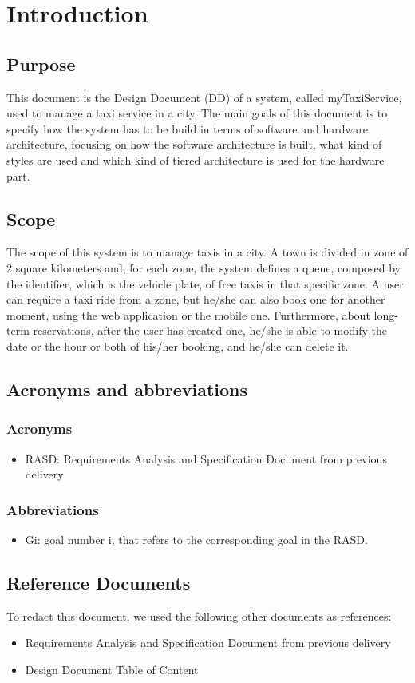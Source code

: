 \section{Introduction}
\subsection{Purpose}
	This document is the Design Document (DD) of a system, called myTaxiService, used to manage  a taxi service in a city. The main goals of this document is to specify how the system has to be build in terms of software and hardware architecture, focusing on how the software architecture is built, what kind of styles are used and which kind of tiered architecture is used for the hardware part.
\subsection{Scope}
	The scope of this system is to manage taxis in a city. A town is divided in zone of 2 square kilometers and, for each zone, the system defines a queue, composed by the identifier, which is the vehicle plate, of free taxis in that specific zone. A user can require a taxi ride from a zone, but he/she can also book one for another moment, using the web application or the mobile one. Furthermore, about long-term reservations, after the user has created one, he/she is able to modify the date or the hour or both of his/her booking, and he/she can delete it. 
\subsection{Acronyms and abbreviations}
	\subsubsection{Acronyms}
		 \begin{itemize}
		 	\item RASD: Requirements Analysis and Specification Document from previous delivery
		 \end{itemize}
	\subsubsection{Abbreviations}
		\begin{itemize}
			\item Gi: goal number i, that refers to the corresponding goal in the RASD.
		\end{itemize}
\subsection{Reference Documents}
	To redact this document, we used the following other documents as references:
	\begin{itemize}
		\item Requirements Analysis and Specification Document from previous delivery
		\item Design Document Table of Content 
	\end{itemize}
